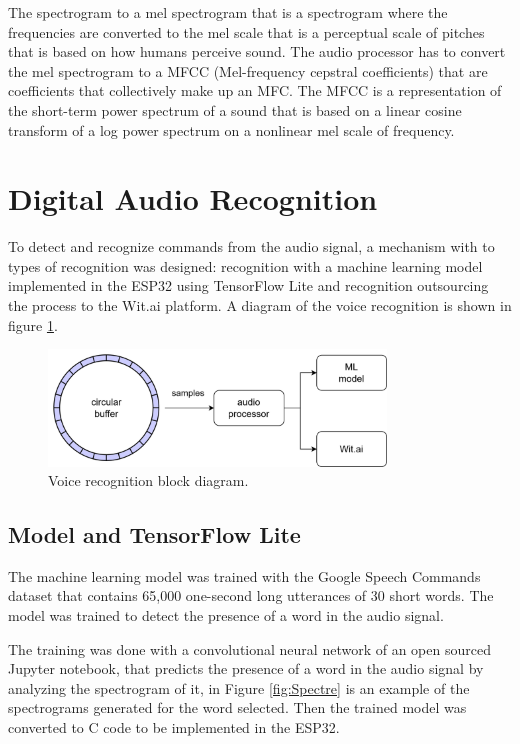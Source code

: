 The spectrogram to a mel spectrogram that is a spectrogram where the frequencies are converted to the mel scale that is a perceptual scale of pitches that is based on how humans perceive sound. The audio processor has to convert the mel spectrogram to a MFCC (Mel-frequency cepstral coefficients) that are coefficients that collectively make up an MFC. The MFCC is a representation of the short-term power spectrum of a sound that is based on a linear cosine transform of a log power spectrum on a nonlinear mel scale of frequency.


\section{Digital Audio Recognition}

To detect and recognize commands from the audio signal, a mechanism with to types of recognition was designed: recognition with a machine learning model implemented in the ESP32 using TensorFlow Lite and recognition outsourcing the process to the Wit.ai platform. A diagram of the voice recognition is shown in figure \ref{fig:VoiceRecognition}.

\begin{figure}
    \centering
    \includegraphics[width=0.8\textwidth]{Images/audio_proc.png}
    \caption{Voice recognition block diagram.}
    \label{fig:VoiceRecognition}
\end{figure}

\subsection{Model and TensorFlow Lite} 
\label{sec:Model}
The machine learning model was trained with the Google Speech Commands dataset that contains 65,000 one-second long utterances of 30 short words. The model was trained to detect the presence of a word in the audio signal. 

The training was done with a convolutional neural network of an open sourced Jupyter notebook, that predicts the presence of a word in the audio signal by analyzing the spectrogram of it, in Figure \ref{fig:Spectre} is an example of the spectrograms generated for the word selected. Then the trained model was converted to C code to be implemented in the ESP32.

